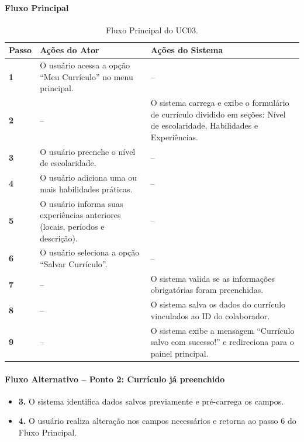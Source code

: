 \documentclass[
    12pt,
    oneside,
    a4paper,
    brazil
]{abntex2}
\begin{document}
\paragraph{Fluxo Principal}
\begin{table}[H]
\centering
\small
\begin{tabularx}{\textwidth}{@{}>{\bfseries}p{1.2cm} L L@{}}
\toprule
Passo & Ações do Ator & Ações do Sistema \\
 & O usuário acessa a opção ``Meu Currículo'' no menu principal. & -- \\
2 & -- & O sistema carrega e exibe o formulário de currículo dividido em seções: Nível de escolaridade, Habilidades e Experiências. \\
3 & O usuário preenche o nível de escolaridade. & -- \\
4 & O usuário adiciona uma ou mais habilidades práticas. & -- \\
5 & O usuário informa suas experiências anteriores (locais, períodos e descrição). & -- \\
6 & O usuário seleciona a opção ``Salvar Currículo''. & -- \\
7 & -- & O sistema valida se as informações obrigatórias foram preenchidas. \\
8 & -- & O sistema salva os dados do currículo vinculados ao ID do colaborador. \\
9 & -- & O sistema exibe a mensagem ``Currículo salvo com sucesso!'' e redireciona para o painel principal. \\
\bottomrule
\end{tabularx}
\caption{Fluxo Principal do UC03.}
\label{tab:uc03_fluxo_principal}
\end{table}

\paragraph{Fluxo Alternativo -- Ponto 2: Currículo já preenchido}
\begin{itemize}
    \item \textbf{3.} O sistema identifica dados salvos previamente e pré-carrega os campos.
    \item \textbf{4.} O usuário realiza alteração nos campos necessários e retorna ao passo 6 do Fluxo Principal.
\end{itemize}
\end{document}
